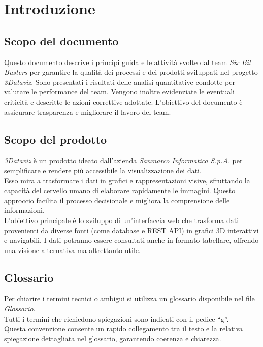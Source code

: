     \section{Introduzione}
    \subsection{Scopo del documento}
        Questo documento descrive i principi guida e le attività svolte dal team \textit{Six Bit Busters} per garantire la qualità dei processi e dei prodotti sviluppati nel progetto \textit{3Dataviz}.  
        Sono presentati i risultati delle analisi quantitative condotte per valutare le performance del team. Vengono inoltre evidenziate le eventuali criticità e descritte le azioni correttive adottate.
        L'obiettivo del documento è assicurare trasparenza e migliorare il lavoro del team.
        
    \subsection{Scopo del prodotto}
        \textit{3Dataviz} è un prodotto ideato dall'azienda \textit{Sanmarco Informatica S.p.A.} per semplificare e rendere più accessibile la visualizzazione dei dati.\\
        Esso mira a trasformare i dati in grafici e rappresentazioni visive, sfruttando la capacità del cervello umano di elaborare rapidamente le immagini. 
        Questo approccio facilita il processo decisionale e migliora la comprensione delle informazioni.\\
        L’obiettivo principale è lo sviluppo di un’interfaccia web che trasforma dati provenienti da diverse fonti (come database e REST API) in grafici 3D interattivi e navigabili. 
        I dati potranno essere consultati anche in formato tabellare, offrendo una visione alternativa ma altrettanto utile.  
        
    \subsection{Glossario}
        Per chiarire i termini tecnici o ambigui si utilizza un glossario disponibile nel file \textit{Glossario}.\\
        Tutti i termini che richiedono spiegazioni sono indicati con il pedice “g”. \\
        Questa convenzione consente un rapido collegamento tra il testo e la relativa spiegazione dettagliata nel glossario, garantendo coerenza e chiarezza.

